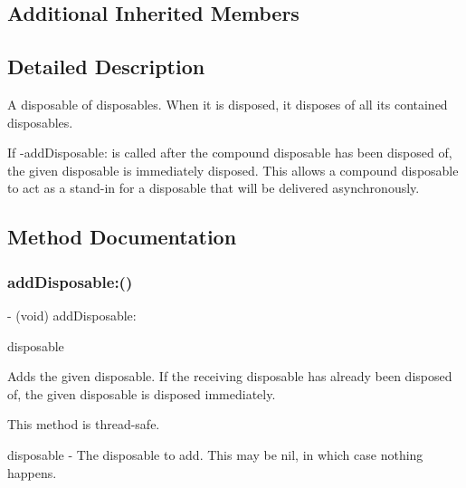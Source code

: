 \subsection*{Additional Inherited Members}


\subsection{Detailed Description}
A disposable of disposables. When it is disposed, it disposes of all its contained disposables.

If -\/add\+Disposable\+: is called after the compound disposable has been disposed of, the given disposable is immediately disposed. This allows a compound disposable to act as a stand-\/in for a disposable that will be delivered asynchronously. 

\subsection{Method Documentation}
\mbox{\label{interface_r_a_c_compound_disposable_adfa5cef74d293abc13c6137289e6f908}} 
\subsubsection{\texorpdfstring{add\+Disposable\+:()}{addDisposable:()}\hspace{0.1cm}{\footnotesize\ttfamily [1/3]}}
{\footnotesize\ttfamily -\/ (void) add\+Disposable\+: \begin{DoxyParamCaption}\item[{(\mbox{\hyperlink{interface_r_a_c_disposable}{R\+A\+C\+Disposable}} $\ast$)}]{disposable }\end{DoxyParamCaption}}

Adds the given disposable. If the receiving disposable has already been disposed of, the given disposable is disposed immediately.

This method is thread-\/safe.

disposable -\/ The disposable to add. This may be nil, in which case nothing happens. \mbox{\label{interface_r_a_c_compound_disposable_adfa5cef74d293abc13c6137289e6f908}} 
